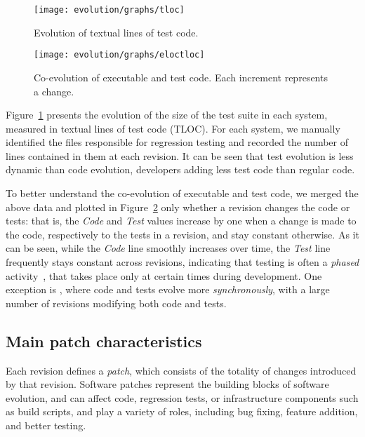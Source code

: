 \begin{figure}[t]
\centering
\texttt{[image: evolution/graphs/tloc]}
\caption{Evolution of textual lines of test code.}
\label{fig:tloc-evol}
\end{figure}


\begin{figure}[t]
\centering
\texttt{[image: evolution/graphs/eloctloc]}
\caption{Co-evolution of executable and test code. Each increment represents a change.}
\label{fig:coeloctloc}
\end{figure}


Figure~\ref{fig:tloc-evol} presents the evolution of the size of the
test suite in each system, measured in textual lines of test code
(TLOC).  For each system, we manually identified the files responsible
for regression testing and recorded the number of lines contained in
them at each revision. It can be seen that test evolution is less
dynamic than code evolution, developers adding less test code than
regular code.


To better understand the co-evolution of executable and test code, we
merged the above data and plotted in Figure~\ref{fig:coeloctloc}
only whether a revision changes the code or tests: that is,
the \emph{Code} and \emph{Test} values increase by one when a change is
made to the code, respectively to the tests in a revision, and stay constant
otherwise.  As it can be seen, while the \emph{Code} line smoothly
increases over time, the \emph{Test} line frequently stays constant
across revisions, indicating that testing is often a \textit{phased}
activity~\cite{coevol:emse11}, that takes place only at certain times
during development. One exception is \git, where code and
tests evolve more \textit{synchronously}, with a large number of
revisions modifying both code and tests.

\subsection{Main patch characteristics}


Each revision defines a \textit{patch}, which consists of the totality
of changes introduced by that revision.  Software patches represent
the building blocks of software evolution, and 
can affect code, regression tests, or infrastructure components such
as build scripts, and play a variety of roles, including bug fixing,
feature addition, and better testing.  

